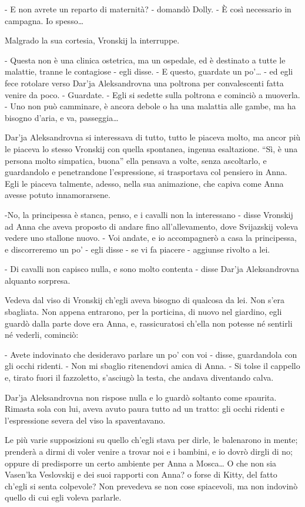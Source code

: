 - E non avrete un reparto di maternità? - domandò Dolly. - È così necessario in campagna. Io spesso\ldots{} 

Malgrado la sua cortesia, Vronskij la interruppe. 

- Questa non è una clinica ostetrica, ma un ospedale, ed è destinato a tutte le malattie, tranne le contagiose - egli disse. - E questo, guardate un po'\ldots{} - ed egli fece rotolare verso Dar'ja Aleksandrovna una poltrona per convalescenti fatta venire da poco. - Guardate. - Egli si sedette sulla poltrona e cominciò a muoverla. - Uno non può camminare, è ancora debole o ha una malattia alle gambe, ma ha bisogno d'aria, e va, passeggia\ldots{} 

Dar'ja Aleksandrovna si interessava di tutto, tutto le piaceva molto, ma ancor più le piaceva lo stesso Vronskij con quella spontanea, ingenua esaltazione. ``Sì, è una persona molto simpatica, buona'' ella pensava a volte, senza ascoltarlo, e guardandolo e penetrandone l'espressione, si trasportava col pensiero in Anna. Egli le piaceva talmente, adesso, nella sua animazione, che capiva come Anna avesse potuto innamorarsene. 

-No, la principessa è stanca, penso, e i cavalli non la interessano - disse Vronskij ad Anna che aveva proposto di andare fino all'allevamento, dove Svijazskij voleva vedere uno stallone nuovo. - Voi andate, e io accompagnerò a casa la principessa, e discorreremo un po' - egli disse - se vi fa piacere - aggiunse rivolto a lei. 

- Di cavalli non capisco nulla, e sono molto contenta - disse Dar'ja Aleksandrovna alquanto sorpresa. 

Vedeva dal viso di Vronskij ch'egli aveva bisogno di qualcosa da lei. Non s'era sbagliata. Non appena entrarono, per la porticina, di nuovo nel giardino, egli guardò dalla parte dove era Anna, e, rassicuratosi ch'ella non potesse né sentirli né vederli, cominciò: 

- Avete indovinato che desideravo parlare un po' con voi - disse, guardandola con gli occhi ridenti. - Non mi sbaglio ritenendovi amica di Anna. - Si tolse il cappello e, tirato fuori il fazzoletto, s'asciugò la testa, che andava diventando calva. 

Dar'ja Aleksandrovna non rispose nulla e lo guardò soltanto come spaurita. Rimasta sola con lui, aveva avuto paura tutto ad un tratto: gli occhi ridenti e l'espressione severa del viso la spaventavano. 

Le più varie supposizioni su quello ch'egli stava per dirle, le balenarono in mente; prenderà a dirmi di voler venire a trovar noi e i bambini, e io dovrò dirgli di no; oppure di predisporre un certo ambiente per Anna a Mosca\ldots{} O che non sia Vasen'ka Veslovskij e dei suoi rapporti con Anna? o forse di Kitty, del fatto ch'egli si senta colpevole? Non prevedeva se non cose spiacevoli, ma non indovinò quello di cui egli voleva parlarle. 

